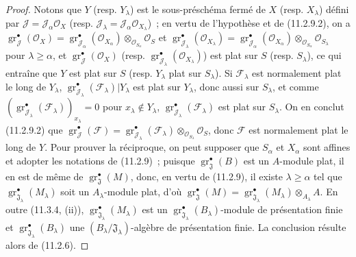 \begin{proof}
Notons que $Y$ (resp. $Y_\lambda$) est le sous-préschéma fermé de $X$ (resp.
$X_\lambda$) défini par $\mathcal J=\mathcal J_\alpha\mathcal O_X$ (resp.
$\mathcal J_\lambda=\mathcal J_\alpha\mathcal O_{X_\lambda}$)~; en vertu de
l'hypothèse et de (11.2.9.2), on a
$\operatorname{gr}_{\mathcal J}^\bullet(\mathcal O_X)
=\operatorname{gr}_{\mathcal J_\alpha}^\bullet(\mathcal O_{X_\alpha})
 \otimes_{\mathcal O_{S_\alpha}}\mathcal O_S$
et
$\operatorname{gr}_{\mathcal J_\lambda}^\bullet(\mathcal O_{X_\lambda})
=\operatorname{gr}_{\mathcal J_\alpha}^\bullet(\mathcal O_{X_\alpha})
 \otimes_{\mathcal O_{S_\alpha}}\mathcal O_{S_\lambda}$
pour $\lambda\geq\alpha$,
et $\operatorname{gr}_{\mathcal J}^\bullet(\mathcal O_X)$ (resp.
$\operatorname{gr}_{\mathcal J_\lambda}^\bullet(\mathcal O_{X_\lambda})$) est plat
sur $S$ (resp. $S_\lambda$), ce qui entraîne que $Y$ est plat sur $S$ (resp.
$Y_\lambda$ plat sur $S_\lambda$). Si $\mathcal F_\lambda$ est normalement plat
le long de $Y_\lambda$, $\operatorname{gr}_{\mathcal J_\lambda}^\bullet
(\mathcal F_\lambda)|Y_\lambda$ est plat sur $Y_\lambda$, donc aussi sur
$S_\lambda$, et comme
$(\operatorname{gr}_{\mathcal J_\lambda}^\bullet(\mathcal F_\lambda))_{x_\lambda}=0$
pour $x_\lambda\notin Y_\lambda$,
$\operatorname{gr}_{\mathcal J_\lambda}^\bullet(\mathcal F_\lambda)$ est plat sur
$S_\lambda$. On en conclut (11.2.9.2) que
$\operatorname{gr}_{\mathcal J}^\bullet(\mathcal F)
=\operatorname{gr}_{\mathcal J_\lambda}^\bullet(\mathcal F_\lambda)
 \otimes_{\mathcal O_{S_\lambda}}\mathcal O_S$,
donc $\mathcal F$ est normalement plat le long de $Y$. Pour prouver la
réciproque, on peut supposer que $S_\alpha$ et $X_\alpha$ sont affines et
adopter les notations de (11.2.9)~; puisque
$\operatorname{gr}_{\mathfrak J}^\bullet(B)$ est un $A$-module plat, il en est de même
de $\operatorname{gr}_{\mathfrak J}^\bullet(M)$, donc, en vertu de (11.2.9), il
existe $\lambda\geq\alpha$ tel que
$\operatorname{gr}_{\mathfrak J_\lambda}^\bullet(M_\lambda)$ soit un
$A_\lambda$-module plat, d'où
$\operatorname{gr}_{\mathfrak J}^\bullet(M)
=\operatorname{gr}_{\mathfrak J_\lambda}^\bullet(M_\lambda)\otimes_{A_\lambda}A$.
En outre (11.3.4, (ii)),
$\operatorname{gr}_{\mathfrak J_\lambda}^\bullet(M_\lambda)$ est un
$\operatorname{gr}_{\mathfrak J_\lambda}^\bullet(B_\lambda)$-module de présentation
finie et $\operatorname{gr}_{\mathfrak J_\lambda}^\bullet(B_\lambda)$ une
$(B_\lambda/\mathfrak J_\lambda)$-algèbre de présentation finie. La conclusion
résulte alors de (11.2.6).
\end{proof}

